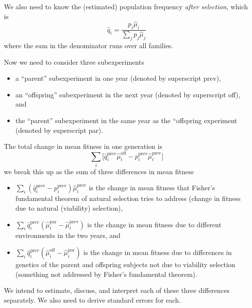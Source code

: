 \documentclass[11pt]{article}
\begin{document}
We also need to know the (estimated) population frequency
\emph{after selection}, which is
$$
   \hat{q}_i = \frac{p_i \hat{\mu}_i}{\sum_j p_j \hat{\mu}_j}
$$
where the sum in the denominator runs over all families.

Now we need to consider three subexperiments
\begin{itemize}
\item a ``parent'' subexperiment in one year (denoted by superscript prev),
\item an ``offspring'' subexperiment in the next year (denoted
    by superscript off), and
\item the ``parent'' subexperiment in the same year as the ``offspring
    experiment (denoted by superscript par).
\end{itemize}

The total change in mean fitness in one generation is
$$
   \textstyle \sum_i \bigl[
   \hat{q}_i^\text{prev} \hat{\mu}_i^\text{off}
   -
   p_i^\text{prev} \hat{\mu}_i^\text{prev}
   \bigr]
$$
we break this up as the sum of three differences in mean fitness
\begin{itemize}
\item $\sum_i (\hat{q}_i^\text{prev} - p_i^\text{prev}) \hat{\mu}_i^\text{prev}$
    is the change in mean fitness that Fisher's fundamental theorem of
    natural selection tries to address (change in fitness due to natural
    (viability) selection),
\item $\sum_i \hat{q}_i^\text{prev} (\hat{\mu}_i^\text{par} -
    \hat{\mu}_i^\text{prev})$
    is the change in mean fitness due to different environments in the
    two years, and
\item $\sum_i \hat{q}_i^\text{prev} (\hat{\mu}_i^\text{off} -
    \hat{\mu}_i^\text{par})$
    is the change in mean fitness due to differences in genetics of the
    parent and offspring subjects not due to viability selection
    (something not addressed by Fisher's fundamental theorem).
\end{itemize}
We intend to estimate, discuss, and interpret each of these three differences
separately.  We also need to derive standard errors for each.
\end{document}
